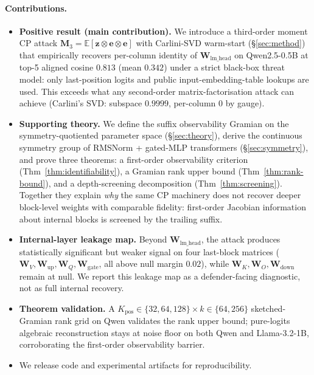 \documentclass{article}
\newcommand{\E}{\mathbb{E}}
\newcommand{\bz}{\mathbf{z}}
\newcommand{\bW}{\mathbf{W}}
\newcommand{\bM}{\mathbf{M}}
\newcommand{\be}{\mathbf{e}}
\begin{document}
\paragraph{Contributions.}
\begin{itemize}
 \item \textbf{Positive result (main contribution).} We introduce a third-order moment CP attack $\bM_3 = \E[\bz \otimes \be \otimes \be]$ with Carlini-SVD warm-start (\S\ref{sec:method}) that empirically recovers per-column identity of $\bW_{\text{lm\_head}}$ on Qwen2.5-0.5B at top-5 aligned cosine $0.813$ (mean $0.342$) under a strict black-box threat model: only last-position logits and public input-embedding-table lookups are used. This exceeds what any second-order matrix-factorisation attack can achieve (Carlini's SVD: subspace $0.9999$, per-column $0$ by gauge).
 \item \textbf{Supporting theory.} We define the suffix observability Gramian on the symmetry-quotiented parameter space (\S\ref{sec:theory}), derive the continuous symmetry group of RMSNorm + gated-MLP transformers (\S\ref{sec:symmetry}), and prove three theorems: a first-order observability criterion (Thm~\ref{thm:identifiability}), a Gramian rank upper bound (Thm~\ref{thm:rank-bound}), and a depth-screening decomposition (Thm~\ref{thm:screening}). Together they explain \emph{why} the same CP machinery does not recover deeper block-level weights with comparable fidelity: first-order Jacobian information about internal blocks is screened by the trailing suffix.
 \item \textbf{Internal-layer leakage map.} Beyond $\bW_{\text{lm\_head}}$, the attack produces statistically significant but weaker signal on four last-block matrices ($\bW_V, \bW_\text{up}, \bW_Q, \bW_\text{gate}$, all above null margin $0.02$), while $\bW_K, \bW_O, \bW_\text{down}$ remain at null. We report this leakage map as a defender-facing diagnostic, not as full internal recovery.
 \item \textbf{Theorem validation.} A $K_{\text{pos}} \in \{32,64,128\} \times k \in \{64,256\}$ sketched-Gramian rank grid on Qwen validates the rank upper bound; pure-logits algebraic reconstruction stays at noise floor on both Qwen and Llama-3.2-1B, corroborating the first-order observability barrier.
 \item We release code and experimental artifacts for reproducibility.
\end{itemize}
\end{document}
